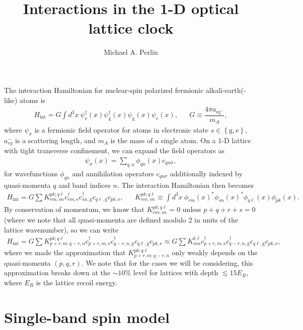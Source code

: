 \documentclass[aps,notitlepage,nofootinbib,11pt]{revtex4-1}
\renewcommand{\t}{\text} %
\newcommand{\f}[2]{\dfrac{#1}{#2}} %
\newcommand{\p}[1]{\left(#1\right)} %
\renewcommand{\set}[1]{\left\{#1\right\}} %
\newcommand{\1}{\mathds{1}}
\newcommand{\g}{\text{g}}
\newcommand{\e}{\text{e}}
\begin{document}
\title{Interactions in the 1-D optical lattice clock}

\author{Michael A. Perlin}

\maketitle

The interaction Hamiltonian for nuclear-spin polarized fermionic
alkali-earth(-like) atoms is
\begin{align}
  H_{\t{int}} = G \int d^3x~
  \psi_\e^\dag\p{x} \psi_\g^\dag\p{x} \psi_\g\p{x} \psi_\e\p{x},
  &&
  G \equiv \f{4\pi a_{\e\g^-}}{m_A},
\end{align}
where $\psi_\sigma$ is a fermionic field operator for atoms in
electronic state $s\in\set{\g,\e}$, $a_{eg}^-$ is a scattering length,
and $m_A$ is the mass of a single atom.  On a 1-D lattice with tight
transverse confinement, we can expand the field operators as
\begin{align}
  \psi_\sigma\p{x} = \sum_{q,n} \phi_{qn}\p{x} c_{qn\sigma},
\end{align}
for wavefunctions $\phi_{qn}$ and annihilation operators
$c_{qn\sigma}$ additionally indexed by quasi-momenta $q$ and band
indices $n$.  The interaction Hamiltonian then becomes
\begin{align}
  H_{\t{int}} = G \sum K^{pk;q\ell}_{rm;sn}
  c_{rm,\e}^\dag c_{sn,\g}^\dag c_{q\ell,\g} c_{pk,\e},
  &&
  K^{pk;q\ell}_{rm;sn} \equiv \int d^3x~
  \phi_{rm}\p{x}^* \phi_{sn}\p{x}^* \phi_{q\ell}\p{x} \phi_{pk}\p{x}.
\end{align}
By conservation of momentum, we know that $K^{pk;q\ell}_{rm;sn}=0$
unless $p+q+r+s=0$ (where we note that all quasi-momenta are defined
modulo 2 in units of the lattice wavenumber), so we can write
\begin{align}
  H_{\t{int}} = G \sum K^{pk;q\ell}_{p+r,m;q-r,n}
  c_{p+r,m,\e}^\dag c_{q-r,n,\g}^\dag c_{q\ell,\g} c_{pk,\e}
  \approx G \sum K^{k\ell}_{mn}
  c_{p+r,m,\e}^\dag c_{q-r,n,\g}^\dag c_{q\ell,\g} c_{pk,\e},
  \label{eq:H_int_full}
\end{align}
where we made the approximation that $K^{pk;q\ell}_{p+r,m;q-r,n}$ only
weakly depends on the quasi-momenta $\p{p,q,r}$.  We note that for the
cases we will be considering, this approximation breaks down at the
$\sim10\%$ level for lattices with depth $\lesssim 15 E_R$, where
$E_R$ is the lattice recoil energy.


\section{Single-band spin model}
\end{document}
